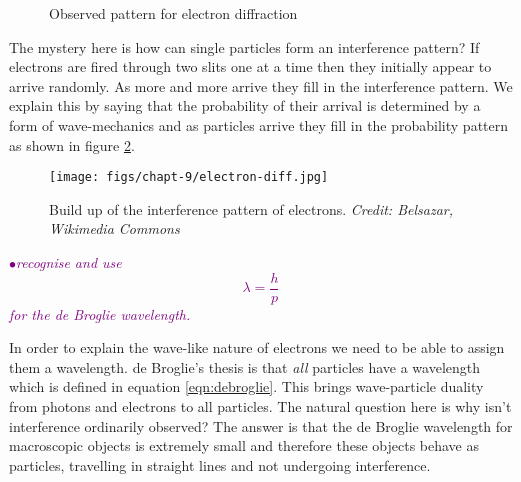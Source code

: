 \documentclass[a4paper,11pt,twoside]{memoir}
\newcounter{spec}[chapter]
\newcommand{\spec}[1]{\Needspace{5\baselineskip}\textcolor{purple}{$\bullet$\hspace{0.5cm}\textit{#1}}}
\begin{document}
\begin{figure}[!h]
  \begin{center}
  \end{center}
  \caption{Observed pattern for electron diffraction}
  \label{fig:electron-diff-observed}
\end{figure}

The mystery here is how can single particles form an interference pattern? If electrons are fired through two slits one at a time then they initially appear to arrive randomly. As more and more arrive they fill in the interference pattern. We explain this by saying that the probability of their arrival is determined by a form of wave-mechanics and as particles arrive they fill in the probability pattern as shown in figure \ref{fig:electron-buildup}.

\begin{figure}
  \begin{center}
  \texttt{[image: figs/chapt-9/electron-diff.jpg]}
\end{center}
  \caption{Build up of the interference pattern of electrons. \emph{Credit: Belsazar, Wikimedia Commons}}
  \label{fig:electron-buildup}
\end{figure}

\clearpage

\spec{recognise and use
\begin{equation}\label{eqn:debroglie}
\lambda = \frac{h}{p}
\end{equation} for the de Broglie wavelength.}

In order to explain the wave-like nature of electrons we need to be able to assign them a wavelength. de Broglie's thesis is that \emph{all} particles have a wavelength which is defined in equation \ref{eqn:debroglie}. This brings wave-particle duality from photons and electrons to all particles. The natural question here is why isn't interference ordinarily observed? The answer is that the de Broglie wavelength for macroscopic objects is extremely small and therefore these objects behave as particles, travelling in straight lines and not undergoing interference.
\end{document}
